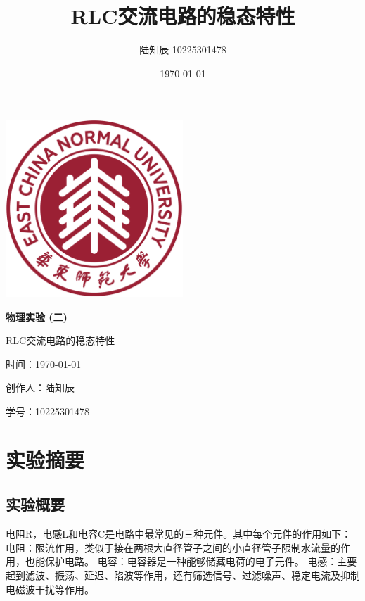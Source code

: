 \documentclass{ctexart}
\title{RLC交流电路的稳态特性}
\author{陆知辰-10225301478}
\date{\today}
\begin{document}
\begin{titlepage}
  \centering
  \includegraphics[width=0.5\textwidth]{ecnu.png}
  
  \vspace*{\baselineskip}
  
  \Huge\textbf{物\quad 理\quad 实\quad 验 \quad (二)}
  \vspace*{0.3\baselineskip}
  
  \huge RLC交流电路的稳态特性
  
  \vspace*{2\baselineskip}
  
  \large 时间：\today
  
  \vspace*{\baselineskip}
  
  \large 创作人：陆知辰
  
  \vspace*{\baselineskip}
  
  \large 学号：10225301478
  
\end{titlepage}
\newpage
\tableofcontents
\newpage
\section{实验摘要}
  \subsection{实验概要}
  电阻R，电感L和电容C是电路中最常见的三种元件。其中每个元件的作用如下：\newline
  电阻：限流作用，类似于接在两根大直径管子之间的小直径管子限制水流量的作用，也能保护电路。\newline
  电容：电容器是一种能够储藏电荷的电子元件。\newline
  电感：主要起到滤波、振荡、延迟、陷波等作用，还有筛选信号、过滤噪声、稳定电流及抑制电磁波干扰等作用。
\end{document}
